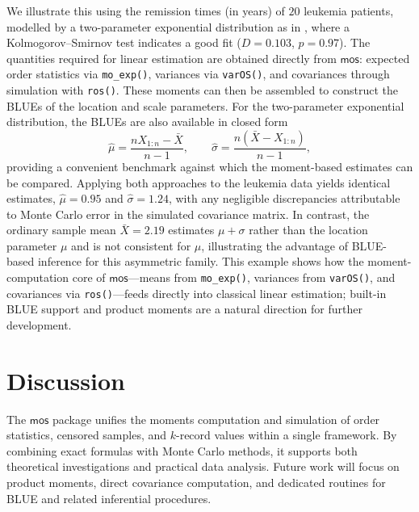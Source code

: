 \documentclass[twoside]{article}
\begin{document}
We illustrate this using the remission times (in years) of $20$ leukemia patients, modelled by a two-parameter exponential distribution as in \citet{Barakat2021}, where a Kolmogorov--Smirnov test indicates a good fit ($D=0.103$, $p=0.97$). 
The quantities required for linear estimation are obtained directly from $\mathsf{mos}$: expected order statistics via \texttt{mo\_exp()}, variances via \texttt{varOS()}, and covariances through simulation with \texttt{ros()}. These moments can then be assembled to construct the BLUEs of the location and scale parameters.
For the two-parameter exponential distribution, the BLUEs are also available in closed form \citep{ArnoldBalakrishnanNagaraja2008}
\[
\hat{\mu}=\frac{nX_{1:n}-\bar X}{n-1}, 
\qquad
\hat{\sigma}=\frac{n(\bar X-X_{1:n})}{n-1},
\]
providing a convenient benchmark against which the moment-based estimates can be compared. Applying both approaches to the leukemia data yields identical estimates,
$\hat{\mu}=0.95$ and
$\hat{\sigma}=1.24$,
with any negligible discrepancies attributable to Monte Carlo error in the simulated covariance matrix. In contrast, the ordinary sample mean $\bar X=2.19$ estimates $\mu+\sigma$ rather than the location parameter $\mu$ and is not consistent for $\mu$, illustrating the advantage of BLUE-based inference for this asymmetric family. 
This example shows how the moment-computation core of
$\mathsf{mos}$---means from \texttt{mo\_exp()}, variances from \texttt{varOS()}, and
covariances via \texttt{ros()}---feeds directly into classical linear estimation;
built-in BLUE support and product moments are a natural direction for further
development.


\section{Discussion}\label{sec:summary}
The $\mathsf{mos}$ package unifies the moments computation and simulation of order statistics, censored samples, and $k$-record values within a single framework. By combining exact formulas with Monte Carlo methods, it supports both theoretical investigations and practical data analysis. Future work will focus on product moments, direct covariance computation, and dedicated routines for BLUE and related inferential procedures.

\end{document}

